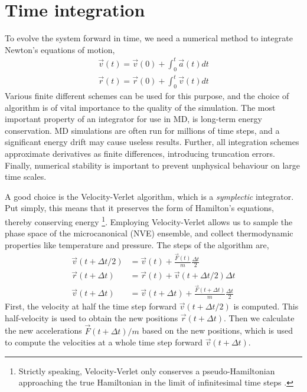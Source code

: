 \documentclass[twoside,english]{uiofysmaster}
\begin{document}
\section{Time integration} \label{sec:timeIntegration}
To evolve the system forward in time, we need a numerical method to integrate Newton's equations of motion,
\begin{align}
 \vec{v}(t) = \vec{v}(0) + \int_0^t\vec{a}(t)dt \label{equationsOfMotion1} \\
 \vec{r}(t) = \vec{r}(0) + \int_0^t\vec{v}(t)dt
 \label{equationsOfMotion2}
\end{align}
Various finite different schemes can be used for this purpose, and the choice of algorithm is 
of vital importance to the quality of the simulation. The most important property of an integrator
for use in MD, is long-term energy conservation. MD simulations are often run for millions of time steps, 
and a significant energy drift may cause useless results. Further, all integration schemes approximate 
derivatives as finite differences, introducing truncation errors. Finally, numerical stability is
important to prevent unphysical behaviour on large time scales. 

A good choice is the Velocity-Verlet algorithm, which is
a \textit{symplectic} integrator. Put simply, this means that it preserves the form of Hamilton's equations, thereby
conserving energy%
\footnote{Strictly speaking, Velocity-Verlet only conserves a pseudo-Hamiltonian
approaching the true Hamiltonian in the limit of infinitesimal time steps \cite{Frenkel01}.}.
Employing Velocity-Verlet
allows us to sample the phase space of the microcanonical (NVE) ensemble, and collect 
thermodynamic properties like temperature and pressure.
The steps of the algorithm are,
\begin{align}
 \vec{v}(t + \Delta t/2) &= \vec{v}(t) + \frac{\vec{F}(t)}{m}\frac{\Delta t}{2} \\
 \vec{r}(t + \Delta t) &= \vec{r}(t) + \vec{v}(t + \Delta t/2)\Delta t \\
 \vec{v}(t + \Delta t) &= \vec{v}(t + \Delta t) + \frac{\vec{F}(t + \Delta t)}{m}\frac{\Delta t}{2}
\end{align}
First, the velocity at half the time step forward $\vec{v}(t + \Delta t/2)$ is computed. 
This half-velocity is used to obtain the new positions $\vec{r}(t + \Delta t)$. 
Then we calculate the new accelerations $\vec{F}(t+\Delta t)/m$ based on the new positions, which is used
to compute the velocities at a whole time step forward $\vec{v}(t + \Delta t)$. 
\end{document}
